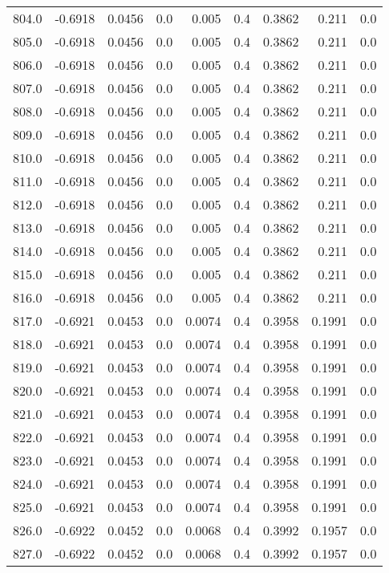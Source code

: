 \begin{longtable}{lrrrrrrrr}
804.0 & -0.6918 & 0.0456 & 0.0 & 0.005 & 0.4 & 0.3862 & 0.211 & 0.0 \\
805.0 & -0.6918 & 0.0456 & 0.0 & 0.005 & 0.4 & 0.3862 & 0.211 & 0.0 \\
806.0 & -0.6918 & 0.0456 & 0.0 & 0.005 & 0.4 & 0.3862 & 0.211 & 0.0 \\
807.0 & -0.6918 & 0.0456 & 0.0 & 0.005 & 0.4 & 0.3862 & 0.211 & 0.0 \\
808.0 & -0.6918 & 0.0456 & 0.0 & 0.005 & 0.4 & 0.3862 & 0.211 & 0.0 \\
809.0 & -0.6918 & 0.0456 & 0.0 & 0.005 & 0.4 & 0.3862 & 0.211 & 0.0 \\
810.0 & -0.6918 & 0.0456 & 0.0 & 0.005 & 0.4 & 0.3862 & 0.211 & 0.0 \\
811.0 & -0.6918 & 0.0456 & 0.0 & 0.005 & 0.4 & 0.3862 & 0.211 & 0.0 \\
812.0 & -0.6918 & 0.0456 & 0.0 & 0.005 & 0.4 & 0.3862 & 0.211 & 0.0 \\
813.0 & -0.6918 & 0.0456 & 0.0 & 0.005 & 0.4 & 0.3862 & 0.211 & 0.0 \\
814.0 & -0.6918 & 0.0456 & 0.0 & 0.005 & 0.4 & 0.3862 & 0.211 & 0.0 \\
815.0 & -0.6918 & 0.0456 & 0.0 & 0.005 & 0.4 & 0.3862 & 0.211 & 0.0 \\
816.0 & -0.6918 & 0.0456 & 0.0 & 0.005 & 0.4 & 0.3862 & 0.211 & 0.0 \\
817.0 & -0.6921 & 0.0453 & 0.0 & 0.0074 & 0.4 & 0.3958 & 0.1991 & 0.0 \\
818.0 & -0.6921 & 0.0453 & 0.0 & 0.0074 & 0.4 & 0.3958 & 0.1991 & 0.0 \\
819.0 & -0.6921 & 0.0453 & 0.0 & 0.0074 & 0.4 & 0.3958 & 0.1991 & 0.0 \\
820.0 & -0.6921 & 0.0453 & 0.0 & 0.0074 & 0.4 & 0.3958 & 0.1991 & 0.0 \\
821.0 & -0.6921 & 0.0453 & 0.0 & 0.0074 & 0.4 & 0.3958 & 0.1991 & 0.0 \\
822.0 & -0.6921 & 0.0453 & 0.0 & 0.0074 & 0.4 & 0.3958 & 0.1991 & 0.0 \\
823.0 & -0.6921 & 0.0453 & 0.0 & 0.0074 & 0.4 & 0.3958 & 0.1991 & 0.0 \\
824.0 & -0.6921 & 0.0453 & 0.0 & 0.0074 & 0.4 & 0.3958 & 0.1991 & 0.0 \\
825.0 & -0.6921 & 0.0453 & 0.0 & 0.0074 & 0.4 & 0.3958 & 0.1991 & 0.0 \\
826.0 & -0.6922 & 0.0452 & 0.0 & 0.0068 & 0.4 & 0.3992 & 0.1957 & 0.0 \\
827.0 & -0.6922 & 0.0452 & 0.0 & 0.0068 & 0.4 & 0.3992 & 0.1957 & 0.0 \\

\end{longtable}
